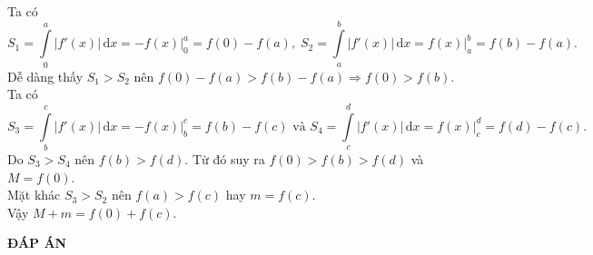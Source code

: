 \begin{ex}
{			Ta có $$ S_1=\displaystyle\int\limits_0^a |f'(x)|\mathrm{\,d}x= -f(x) \big|_{0}^{a}=f(0)-f(a),\;
			S_2=\displaystyle\int\limits_a^b |f'(x)|\mathrm{\,d}x=f(x) \big|_{a}^{b}=f(b)-f(a).$$
			Dễ dàng thấy  $S_1>S_2$ nên $f(0)-f(a)> f(b)-f(a) \Rightarrow  f(0)>f(b)$.\\
			Ta có $$ S_3=\displaystyle\int\limits_b^c |f'(x)|\mathrm{\,d}x= -f(x) \big|_{b}^{c}=f(b)-f(c)  \text{ và }  S_4=\displaystyle\int\limits_c^d |f'(x)|\mathrm{\,d}x= f(x) \big|_{c}^{d}=f(d)-f(c). $$
			Do $S_3>S_4$ nên $f(b)>f(d)$. Từ đó suy ra $f(0)>f(b)>f(d)$ và $M=f(0)$.\\
			Mặt khác $S_3>S_2$ nên $f(a)>f(c)$ hay $m=f(c)$.\\
			Vậy $M+m=f(0)+f(c).$
		}
	\end{ex}
\newpage
\begin{center}
	\textbf{ĐÁP ÁN}
\end{center}
\begin{multicols}{10}
	 
\end{multicols}